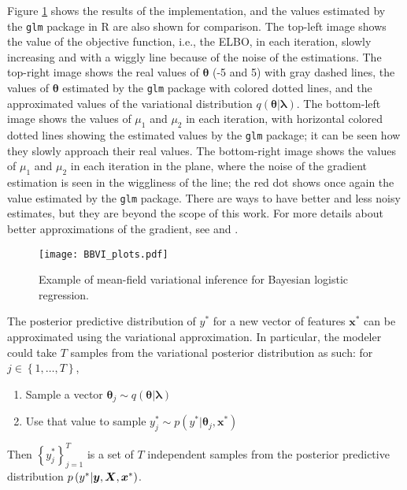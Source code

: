 Figure \ref{fig:BBVI_plots} shows the results of the implementation, and the values estimated by the \texttt{glm} package in R are also shown for comparison. The top-left image shows the value of the objective function, i.e., the ELBO, in each iteration, slowly increasing and with a wiggly line because of the noise of the estimations. The top-right image shows the real values of $\boldsymbol{\theta}$ (-5 and 5) with gray dashed lines, the values of $\boldsymbol{\theta}$ estimated by the \texttt{glm} package with colored dotted lines, and the approximated values of the variational distribution $q(\boldsymbol{\theta} | \boldsymbol{\lambda})$.
The bottom-left image shows the values of $\mu_1$ and $\mu_2$ in each iteration, with horizontal colored dotted lines showing the estimated values by the \texttt{glm} package; it can be seen how they slowly approach their real values.
The bottom-right image shows the values of $\mu_1$ and $\mu_2$ in each iteration in the plane, where the noise of the gradient estimation is seen in the wiggliness of the line; the red dot shows once again the value estimated by the \texttt{glm} package.
There are ways to have better and less noisy estimates, but they are beyond the scope of this work. For more details about better approximations of the gradient, see \cite{kucukelbir2017automatic} and \cite{ranganath2014black}.

\begin{figure}[H]
    \centering
    \texttt{[image: BBVI\_plots.pdf]}
    \caption{Example of mean-field variational inference for Bayesian logistic regression.}
    \label{fig:BBVI_plots}
\end{figure}

The posterior predictive distribution of $y^*$ for a new vector of features $\boldsymbol{x}^*$ can be approximated using the variational approximation. In particular, the modeler could take $T$ samples from the variational posterior distribution as such: for $j \in \left\{ 1, \ldots, T \right\}$,
\begin{enumerate}
  \item Sample a vector $\boldsymbol{\theta}_j \sim q(\boldsymbol{\theta} | \boldsymbol{\lambda})$
  \item Use that value to sample $y_j^* \sim p(y^* | \boldsymbol{\theta}_j, \boldsymbol{x}^*)$
\end{enumerate}
Then $\left\{ y_j^* \right\}_{j = 1}^T$ is a set of $T$ independent samples from the posterior predictive distribution $p\left( y^* | \boldsymbol{y}, \boldsymbol{X}, \boldsymbol{x}^* \right)$.
